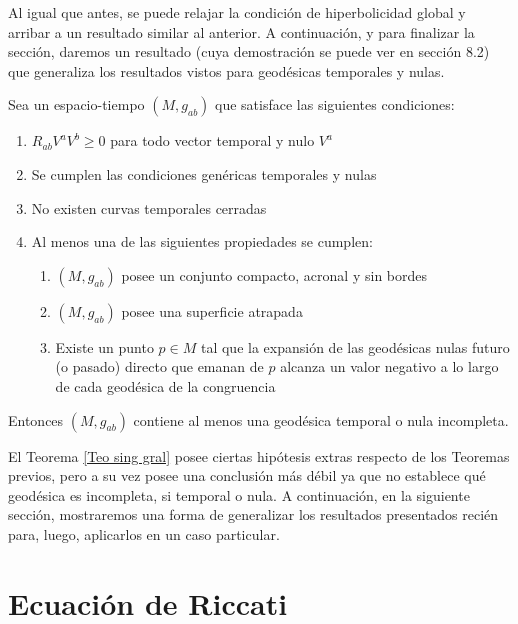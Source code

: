 Al igual que antes, se puede relajar la condición de hiperbolicidad global y arribar a un resultado similar al anterior. A continuación, y para finalizar la sección, daremos un resultado (cuya demostración se puede ver en \citep{1975lsss.book.....H} sección 8.2) que generaliza los resultados vistos para geodésicas temporales y nulas. 

\begin{theorem}\label{Teo sing gral}
Sea un espacio-tiempo $(M,g_{ab})$ que satisface las siguientes condiciones:
    \begin{enumerate}[{1)}]
        \item $R_{ab}V^aV^b\geq0$ para todo vector temporal y nulo $V^a$
        \item Se cumplen las condiciones genéricas temporales y nulas 
        \item No existen curvas temporales cerradas  
        \item Al menos una de las siguientes propiedades se cumplen:
            \begin{enumerate}[{a)}]
                \item $(M,g_{ab})$ posee un conjunto compacto, acronal y sin bordes 
                \item $(M,g_{ab})$ posee una superficie atrapada
                \item Existe un punto $p\in M$ tal que la expansión de las geodésicas nulas futuro (o pasado) directo que emanan de $p$ alcanza un valor negativo a lo largo de cada geodésica de la congruencia 
            \end{enumerate}
    \end{enumerate}
Entonces $(M,g_{ab})$ contiene al menos una geodésica temporal o nula incompleta.
\end{theorem}


El Teorema \ref{Teo sing gral} posee ciertas hipótesis extras respecto de los Teoremas previos, pero a su vez posee una conclusión más débil ya que no establece qué geodésica es incompleta, si temporal o nula. A continuación, en la siguiente sección, mostraremos una forma de generalizar los resultados presentados recién para, luego, aplicarlos en un caso particular.










\section{Ecuación de Riccati} 

